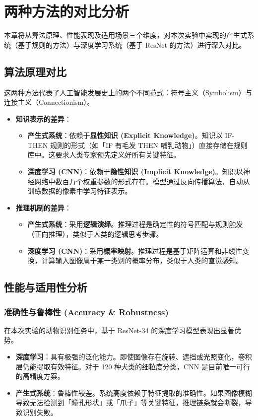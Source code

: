 \documentclass[supercite]{Experimental_Report}
\theoremstyle{definition}
\begin{document}
	\section{两种方法的对比分析}
	本章将从算法原理、性能表现及适用场景三个维度，对本次实验中实现的产生式系统（基于规则的方法）与深度学习系统（基于 ResNet 的方法）进行深入对比。
	
	\subsection{算法原理对比}
	这两种方法代表了人工智能发展史上的两个不同范式：符号主义（Symbolism）与连接主义（Connectionism）。
	
	\begin{itemize}
		\item \textbf{知识表示的差异}：
		\begin{itemize}
			\item \textbf{产生式系统}：依赖于\textbf{显性知识 (Explicit Knowledge)}。知识以 IF-THEN 规则的形式（如「IF 有毛发 THEN 哺乳动物」）直接存储在规则库中。这要求人类专家预先定义好所有关键特征。
			\item \textbf{深度学习 (CNN)}：依赖于\textbf{隐性知识 (Implicit Knowledge)}。知识以神经网络中数百万个权重参数的形式存在。模型通过反向传播算法，自动从训练数据的像素中学习特征表示。
		\end{itemize}
		
		\item \textbf{推理机制的差异}：
		\begin{itemize}
			\item \textbf{产生式系统}：采用\textbf{逻辑演绎}。推理过程是确定性的符号匹配与规则触发（正向推理），类似于人类的逻辑思考步骤。
			\item \textbf{深度学习 (CNN)}：采用\textbf{概率映射}。推理过程是基于矩阵运算和非线性变换，计算输入图像属于某一类别的概率分布，类似于人类的直觉感知。
		\end{itemize}
	\end{itemize}
	
	\subsection{性能与适用性分析}
	
	\subsubsection{准确性与鲁棒性 (Accuracy \& Robustness)}
	在本次实验的动物识别任务中，基于 ResNet-34 的深度学习模型表现出显著优势。
	\begin{itemize}
		\item \textbf{深度学习}：具有极强的泛化能力。即使图像存在旋转、遮挡或光照变化，卷积层仍能提取有效特征。对于 120 种犬类的细粒度分类，CNN 是目前唯一可行的高精度方案。
		\item \textbf{产生式系统}：鲁棒性较差。系统高度依赖于特征提取的准确性。如果图像模糊导致无法检测到「瞳孔形状」或「爪子」等关键特征，推理链条就会断裂，导致识别失败。
	\end{itemize}
	
\end{document}
